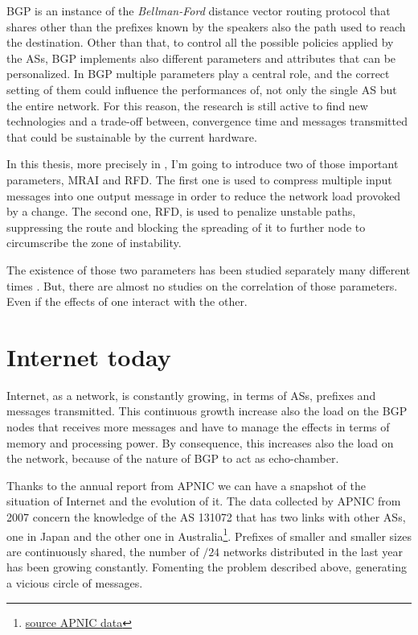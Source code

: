 \ac{BGP} is an instance of the \textit{Bellman-Ford} distance vector routing
protocol that shares other than the prefixes known by the speakers also the
path used to reach the destination.
Other than that, to control all the possible policies applied by the \acp{AS},
\ac{BGP} implements also different parameters and attributes that can be
personalized.
In \ac{BGP} multiple parameters play a central role, and the correct setting
of them could influence the performances of, not only the single \ac{AS} but
the entire network.
For this reason, the research is still active to find new technologies and
a trade-off between, convergence time and messages transmitted that could
be sustainable by the current hardware.

In this thesis, more precisely in , I'm going to introduce
two of those important parameters, \ac{MRAI} and \ac{RFD}.
The first one is used to compress multiple input messages into one
output message in order to reduce the network load provoked by a change.
The second one, \ac{RFD}, is used to penalize unstable paths, suppressing
the route and blocking the spreading of it to further node to circumscribe
the zone of instability.

The existence of those two parameters has been studied separately many different
times \cite{fabrikant2011there,daggitt2018rate,qiu2005optimal,gray2020bgp}.
But, there are almost no studies on the correlation of those parameters.
Even if the effects of one interact with the other.

\section{Internet today}
\label{sec:internet_today}

Internet, as a network, is constantly growing, in terms of \acp{AS}, prefixes
and messages transmitted.
This continuous growth increase also the load on the \ac{BGP} nodes that
receives more messages and have to manage the effects in terms of memory
and processing power.
By consequence, this increases also the load on the network, because of the
nature of \ac{BGP} to act as echo-chamber.

Thanks to the annual report from \ac{APNIC} we can have a snapshot of
the situation of Internet and the evolution of it.
The data collected by \ac{APNIC} from \num{2007} concern the knowledge
of the \ac{AS} 131072 that has two links with other \acp{AS}, one in Japan and
the other one in Australia\footnote{\href{https://blog.apnic.net/2021/01/05/bgp-in-2020-the-bgp-table/}{source APNIC data}}.
Prefixes of smaller and smaller sizes are continuously shared, the number of
$/24$ networks distributed in the last year has been growing constantly.
Fomenting the problem described above, generating a vicious circle of messages.

